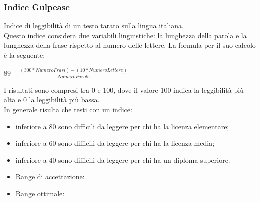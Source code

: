 \documentclass[a4paper,11pt]{article}
\begin{document}
\subsubsection{Indice Gulpease} Indice di leggibilità di un testo tarato sulla lingua italiana. \\
Questo indice considera due variabili linguistiche: la lunghezza della parola e la lunghezza della frase rispetto al numero delle lettere.
La formula per il suo calcolo è la seguente:\\
\begin{center}
\begin{math}
89 - \frac{(300 * NumeroFrasi) - (10 * NumeroLettere)}{NumeroParole}
\end{math}
\end{center}
I risultati sono compresi tra 0 e 100, dove il valore 100 indica la leggibilità più alta e 0 la leggibilità più bassa.\\
In generale risulta che testi con un indice:
\begin{itemize}
\item inferiore a 80 sono difficili da leggere per chi ha la licenza elementare;
\item inferiore a 60 sono difficili da leggere per chi ha la licenza media;
\item inferiore a 40 sono difficili da leggere per chi ha un diploma superiore.
\end{itemize}
\begin{itemize}
\item Range di accettazione: \begin{math}[50 - 100]\end{math}
\item Range ottimale: \begin{math}[60 - 100]\end{math}
\end{itemize}
\newpage
\end{document}
